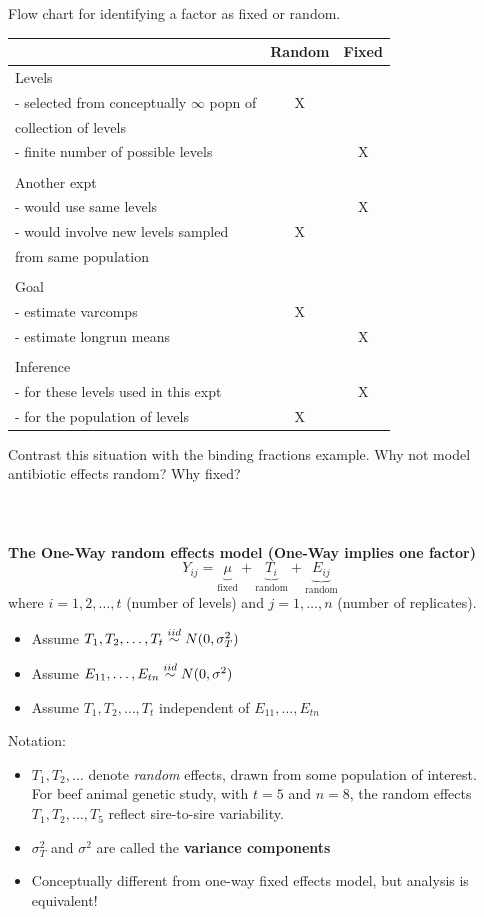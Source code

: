 \newpage

\begin{center}
Flow chart for identifying a factor as fixed or random.\\
\begin{tabular}{l| c c}
& Random & Fixed \\ \hline
Levels \\
- selected from conceptually $\infty$ popn of & X & \\
collection of levels & & \\
- finite number of possible  levels & & X \\
\\ \hline
Another expt & & \\
- would use same levels & & X \\
- would involve new levels sampled & X & \\
from same population \\
\\ \hline
Goal  & & \\
- estimate varcomps & X & \\
- estimate longrun means & & X\\
\\ \hline
Inference & & \\
- for these levels  used in this expt & & X\\
- for the population of levels & X & \\
\end{tabular}
\end{center}
Contrast this situation with the binding fractions example.  Why not model antibiotic effects random?  Why fixed?\\~\\~\\~\\

\textbf{The One-Way random effects model (One-Way implies one factor)}
$$ Y_{ij} = \underbrace{\mu}_{\text{fixed}} + \underbrace{T_i}_{\text{random}} + \underbrace{E_{ij}}_{\text{random}}$$
where $i=1,2,\ldots,t$ (number of levels) and $j=1,\ldots,n$ (number of replicates).
\begin{itemize}
\item Assume $T_1,T_2,\ldots,T_t \stackrel{iid}{\sim} N(0,\sigma_T^2)$
\item Assume $E_{11},\ldots,E_{tn} \stackrel{iid}{\sim} N(0,\sigma^2)$
\item Assume $T_1,T_2,\ldots,T_t$ independent of $E_{11},\ldots,E_{tn}$
\end{itemize}
Notation:
\begin{itemize}
\item $T_1,T_2,\ldots$ denote {\em random} effects, drawn from some population of interest. \\For beef animal genetic study, with $t=5$ and $n=8$, the random effects $T_1,T_2,\ldots,T_5$ reflect sire-to-sire variability.  
\item $\sigma_T^2$ and $\sigma^2$ are called the \textbf{variance components}
\item Conceptually different from one-way fixed effects model, but analysis is equivalent!
\end{itemize}

